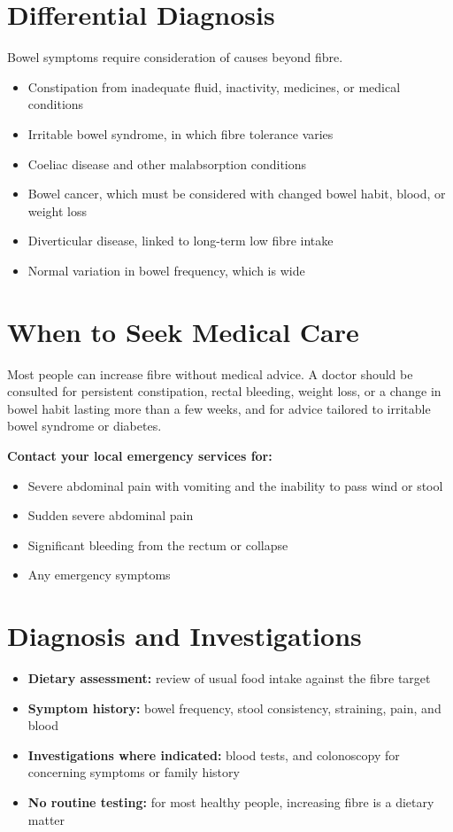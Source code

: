 \section*{Differential Diagnosis}
Bowel symptoms require consideration of causes beyond fibre.
\begin{itemize}
    \item Constipation from inadequate fluid, inactivity, medicines, or medical conditions
    \item Irritable bowel syndrome, in which fibre tolerance varies
    \item Coeliac disease and other malabsorption conditions
    \item Bowel cancer, which must be considered with changed bowel habit, blood, or weight loss
    \item Diverticular disease, linked to long-term low fibre intake
    \item Normal variation in bowel frequency, which is wide
\end{itemize}

\section*{When to Seek Medical Care}
Most people can increase fibre without medical advice. A doctor should be consulted for persistent constipation, rectal bleeding, weight loss, or a change in bowel habit lasting more than a few weeks, and for advice tailored to irritable bowel syndrome or diabetes.

\textbf{Contact your local emergency services for:}
\begin{itemize}
    \item Severe abdominal pain with vomiting and the inability to pass wind or stool
    \item Sudden severe abdominal pain
    \item Significant bleeding from the rectum or collapse
    \item Any emergency symptoms
\end{itemize}

\section*{Diagnosis and Investigations}
\begin{itemize}
    \item \textbf{Dietary assessment:} review of usual food intake against the fibre target
    \item \textbf{Symptom history:} bowel frequency, stool consistency, straining, pain, and blood
    \item \textbf{Investigations where indicated:} blood tests, and colonoscopy for concerning symptoms or family history
    \item \textbf{No routine testing:} for most healthy people, increasing fibre is a dietary matter
\end{itemize}


